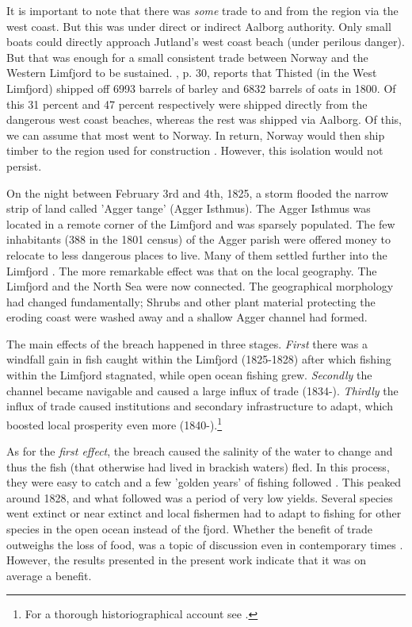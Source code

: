 \documentclass[11pt]{article}
\begin{document}
It is important to note that there was \textit{some} trade to and from the region via the west coast. But this was under direct or indirect Aalborg authority. Only small boats could directly approach Jutland's west coast beach (under perilous danger). But that was enough for a small consistent trade between Norway and the Western Limfjord to be sustained. \cite{Aagard1802}, p. 30, reports that Thisted (in the West Limfjord) shipped off 6993 barrels of barley and 6832 barrels of oats in 1800. Of this 31 percent and 47 percent respectively were shipped directly from the dangerous west coast beaches, whereas the rest was shipped via Aalborg. Of this, we can assume that most went to Norway. In return, Norway would then ship timber to the region used for construction \citep[p. 234]{Christensen1735}. However, this isolation would not persist.

On the night between February 3rd and 4th, 1825, a storm flooded the narrow strip of land called 'Agger tange' (Agger Isthmus). The Agger Isthmus was located in a remote corner of the Limfjord and was sparsely populated. The few inhabitants (388 in the 1801 census) of the Agger parish were offered money to relocate to less dangerous places to live. Many of them settled further into the Limfjord \citep{Poulsen2019, Poulsen2022}. The more remarkable effect was that on the local geography. The Limfjord and the North Sea were now connected. The geographical morphology had changed fundamentally; Shrubs and other plant material protecting the eroding coast were washed away and a shallow Agger channel had formed.

The main effects of the breach happened in three stages. \textit{First} there was a windfall gain in fish caught within the Limfjord (1825-1828) after which fishing within the Limfjord stagnated, while open ocean fishing grew. \textit{Secondly} the channel became navigable and caused a large influx of trade (1834-). \textit{Thirdly} the influx of trade caused institutions and secondary infrastructure to adapt, which boosted local prosperity even more (1840-).\footnote{For a thorough historiographical account see \cite{Poulsen2022}.}

As for the \textit{first effect}, the breach caused the salinity of the water to change and thus the fish (that otherwise had lived in brackish waters) fled. In this process, they were easy to catch and a few 'golden years' of fishing followed \citep{Poulsen2007}. This peaked around 1828, and what followed was a period of very low yields. Several species went extinct or near extinct \citep{Poulsen2019} and local fishermen had to adapt to fishing for other species in the open ocean instead of the fjord. Whether the benefit of trade outweighs the loss of food, was a topic of discussion even in contemporary times \citep[p. 1]{petersen1853oplysende}. However, the results presented in the present work indicate that it was on average a benefit.
\end{document}
